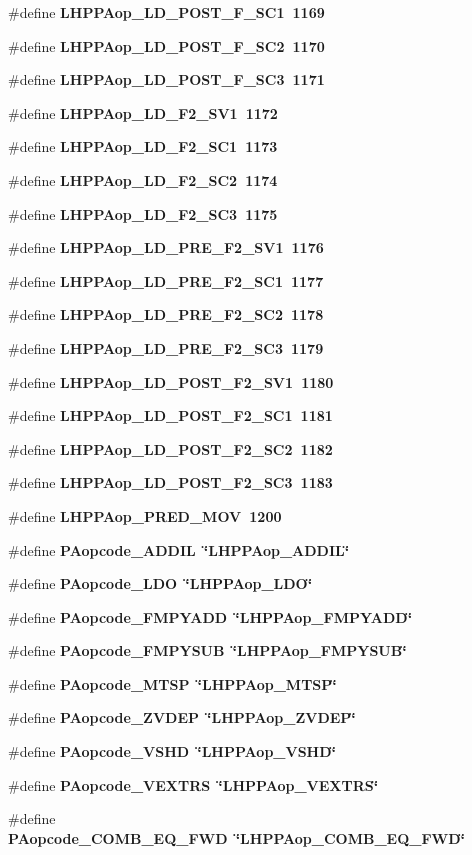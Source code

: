 \begin{CompactItemize}
\item 
\#define \bf{LHPPAop\_\-LD\_\-POST\_\-F\_\-SC1}~1169
\item 
\#define \bf{LHPPAop\_\-LD\_\-POST\_\-F\_\-SC2}~1170
\item 
\#define \bf{LHPPAop\_\-LD\_\-POST\_\-F\_\-SC3}~1171
\item 
\#define \bf{LHPPAop\_\-LD\_\-F2\_\-SV1}~1172
\item 
\#define \bf{LHPPAop\_\-LD\_\-F2\_\-SC1}~1173
\item 
\#define \bf{LHPPAop\_\-LD\_\-F2\_\-SC2}~1174
\item 
\#define \bf{LHPPAop\_\-LD\_\-F2\_\-SC3}~1175
\item 
\#define \bf{LHPPAop\_\-LD\_\-PRE\_\-F2\_\-SV1}~1176
\item 
\#define \bf{LHPPAop\_\-LD\_\-PRE\_\-F2\_\-SC1}~1177
\item 
\#define \bf{LHPPAop\_\-LD\_\-PRE\_\-F2\_\-SC2}~1178
\item 
\#define \bf{LHPPAop\_\-LD\_\-PRE\_\-F2\_\-SC3}~1179
\item 
\#define \bf{LHPPAop\_\-LD\_\-POST\_\-F2\_\-SV1}~1180
\item 
\#define \bf{LHPPAop\_\-LD\_\-POST\_\-F2\_\-SC1}~1181
\item 
\#define \bf{LHPPAop\_\-LD\_\-POST\_\-F2\_\-SC2}~1182
\item 
\#define \bf{LHPPAop\_\-LD\_\-POST\_\-F2\_\-SC3}~1183
\item 
\#define \bf{LHPPAop\_\-PRED\_\-MOV}~1200
\item 
\#define \bf{PAopcode\_\-ADDIL}~\char`\"{}LHPPAop\_\-ADDIL\char`\"{}
\item 
\#define \bf{PAopcode\_\-LDO}~\char`\"{}LHPPAop\_\-LDO\char`\"{}
\item 
\#define \bf{PAopcode\_\-FMPYADD}~\char`\"{}LHPPAop\_\-FMPYADD\char`\"{}
\item 
\#define \bf{PAopcode\_\-FMPYSUB}~\char`\"{}LHPPAop\_\-FMPYSUB\char`\"{}
\item 
\#define \bf{PAopcode\_\-MTSP}~\char`\"{}LHPPAop\_\-MTSP\char`\"{}
\item 
\#define \bf{PAopcode\_\-ZVDEP}~\char`\"{}LHPPAop\_\-ZVDEP\char`\"{}
\item 
\#define \bf{PAopcode\_\-VSHD}~\char`\"{}LHPPAop\_\-VSHD\char`\"{}
\item 
\#define \bf{PAopcode\_\-VEXTRS}~\char`\"{}LHPPAop\_\-VEXTRS\char`\"{}
\item 
\#define \bf{PAopcode\_\-COMB\_\-EQ\_\-FWD}~\char`\"{}LHPPAop\_\-COMB\_\-EQ\_\-FWD\char`\"{}

\end{CompactItemize}

